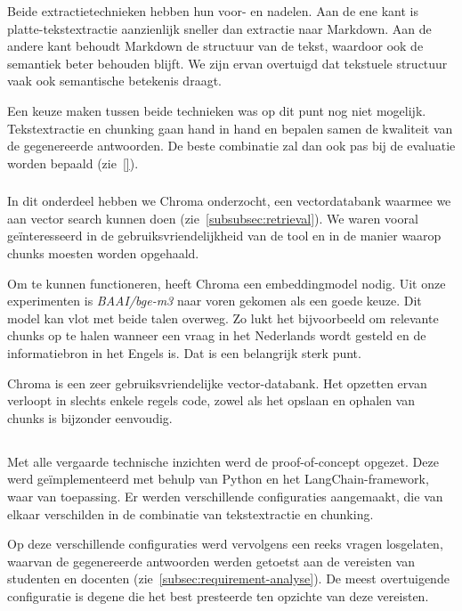 Beide extractietechnieken hebben hun voor- en nadelen. Aan de ene kant is platte-tekstextractie aanzienlijk sneller dan extractie naar Markdown. Aan de andere kant behoudt Markdown de structuur van de tekst, waardoor ook de semantiek beter behouden blijft. We zijn ervan overtuigd dat tekstuele structuur vaak ook semantische betekenis draagt.

Een keuze maken tussen beide technieken was op dit punt nog niet mogelijk. Tekstextractie en chunking gaan hand in hand en bepalen samen de kwaliteit van de gegenereerde antwoorden. De beste combinatie zal dan ook pas bij de evaluatie worden bepaald (zie~\ref{}).

\subsubsection{}%
\label{subsubsec:onderzoek-chunking}

\subsubsection{}%
\label{subsubsec:onderzoek-indexing}

In dit onderdeel hebben we Chroma onderzocht, een vectordatabank waarmee we aan vector search kunnen doen (zie~\ref{subsubsec:retrieval}). We waren vooral geïnteresseerd in de gebruiksvriendelijkheid van de tool en in de manier waarop chunks moesten worden opgehaald.

Om te kunnen functioneren, heeft Chroma een embeddingmodel nodig. Uit onze experimenten is \emph{BAAI/bge-m3} naar voren gekomen als een goede keuze. Dit model kan vlot met beide talen overweg. Zo lukt het bijvoorbeeld om relevante chunks op te halen wanneer een vraag in het Nederlands wordt gesteld en de informatiebron in het Engels is. Dat is een belangrijk sterk punt.

Chroma is een zeer gebruiksvriendelijke vector-databank. Het opzetten ervan verloopt in slechts enkele regels code, zowel als het opslaan en ophalen van chunks is bijzonder eenvoudig.

\subsection{}%
\label{subsec:poc-opzetting}

Met alle vergaarde technische inzichten werd de proof-of-concept opgezet. Deze werd geïmplementeerd met behulp van Python en het LangChain-framework, waar van toepassing. Er werden verschillende configuraties aangemaakt, die van elkaar verschilden in de combinatie van tekstextractie en chunking.

Op deze verschillende configuraties werd vervolgens een reeks vragen losgelaten, waarvan de gegenereerde antwoorden werden getoetst aan de vereisten van studenten en docenten (zie~\ref{subsec:requirement-analyse}). De meest overtuigende configuratie is degene die het best presteerde ten opzichte van deze vereisten.

